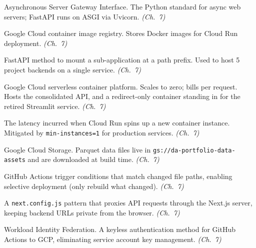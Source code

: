 \begin{description}[style=nextline, leftmargin=2em]

\item[\textbf{ASGI}] Asynchronous Server Gateway Interface. The Python standard for async web servers; FastAPI runs on ASGI via Uvicorn. \textit{(Ch.~7)}

\item[\textbf{Artifact Registry}] Google Cloud container image registry. Stores Docker images for Cloud Run deployment. \textit{(Ch.~7)}

\item[\textbf{app.mount()}] FastAPI method to mount a sub-application at a path prefix. Used to host 5 project backends on a single service. \textit{(Ch.~7)}

\item[\textbf{Cloud Run}] Google Cloud serverless container platform. Scales to zero; bills per request. Hosts the consolidated API, and a redirect-only container standing in for the retired Streamlit service. \textit{(Ch.~7)}

\item[\textbf{Cold Start}] The latency incurred when Cloud Run spins up a new container instance. Mitigated by \texttt{min-instances=1} for production services. \textit{(Ch.~7)}

\item[\textbf{GCS}] Google Cloud Storage. Parquet data files live in \texttt{gs://da-portfolio-data-assets} and are downloaded at build time. \textit{(Ch.~7)}

\item[\textbf{Path Filters}] GitHub Actions trigger conditions that match changed file paths, enabling selective deployment (only rebuild what changed). \textit{(Ch.~7)}

\item[\textbf{Rewrites (Next.js)}] A \texttt{next.config.js} pattern that proxies API requests through the Next.js server, keeping backend URLs private from the browser. \textit{(Ch.~7)}

\item[\textbf{WIF}] Workload Identity Federation. A keyless authentication method for GitHub Actions to GCP, eliminating service account key management. \textit{(Ch.~7)}

\end{description}
